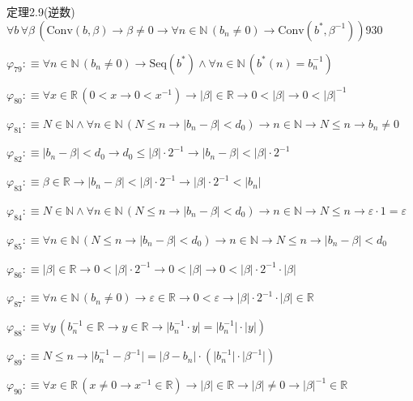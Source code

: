 \begin{fullproof}{定理2.9(逆数)}{$\forall b\,\forall \beta\,(\mathrm{Conv}(b,\beta) \to \beta \neq 0 \to \forall n \in \mathbb{N}\,(b_{n} \neq 0) \to \mathrm{Conv}(b^{\ast},\beta^{-1}))$}{930}
\begin{abbrevlist}
\item $\varphi_{79} :\equiv \forall n \in \mathbb{N}\,(b_{n} \neq 0) \to \mathrm{Seq}(b^{\ast}) \land \forall n \in \mathbb{N}\,(b^{\ast}(n) = b_{n}^{-1})$
\item $\varphi_{80} :\equiv \forall x \in \mathbb{R}\,(0 < x \to 0 < x^{-1}) \to \lvert \beta \rvert \in \mathbb{R} \to 0 < \lvert \beta \rvert \to 0 < \lvert \beta \rvert^{-1}$
\item $\varphi_{81} :\equiv N \in \mathbb{N} \land \forall n \in \mathbb{N}\,(N \leq n \to \lvert b_{n} - \beta \rvert < d_{0}) \to n \in \mathbb{N} \to N \leq n \to b_{n} \neq 0$
\item $\varphi_{82} :\equiv \lvert b_{n} - \beta \rvert < d_{0} \to d_{0} \leq \lvert \beta \rvert \cdot 2^{-1} \to \lvert b_{n} - \beta \rvert < \lvert \beta \rvert \cdot 2^{-1}$
\item $\varphi_{83} :\equiv \beta \in \mathbb{R} \to \lvert b_{n} - \beta \rvert < \lvert \beta \rvert \cdot 2^{-1} \to \lvert \beta \rvert \cdot 2^{-1} < \lvert b_{n} \rvert$
\item $\varphi_{84} :\equiv N \in \mathbb{N} \land \forall n \in \mathbb{N}\,(N \leq n \to \lvert b_{n} - \beta \rvert < d_{0}) \to n \in \mathbb{N} \to N \leq n \to \varepsilon \cdot 1 = \varepsilon$
\item $\varphi_{85} :\equiv \forall n \in \mathbb{N}\,(N \leq n \to \lvert b_{n} - \beta \rvert < d_{0}) \to n \in \mathbb{N} \to N \leq n \to \lvert b_{n} - \beta \rvert < d_{0}$
\item $\varphi_{86} :\equiv \lvert \beta \rvert \in \mathbb{R} \to 0 < \lvert \beta \rvert \cdot 2^{-1} \to 0 < \lvert \beta \rvert \to 0 < \lvert \beta \rvert \cdot 2^{-1} \cdot \lvert \beta \rvert$
\item $\varphi_{87} :\equiv \forall n \in \mathbb{N}\,(b_{n} \neq 0) \to \varepsilon \in \mathbb{R} \to 0 < \varepsilon \to \lvert \beta \rvert \cdot 2^{-1} \cdot \lvert \beta \rvert \in \mathbb{R}$
\item $\varphi_{88} :\equiv \forall y\,(b_{n}^{-1} \in \mathbb{R} \to y \in \mathbb{R} \to \lvert b_{n}^{-1} \cdot y \rvert = \lvert b_{n}^{-1} \rvert \cdot \lvert y \rvert)$
\item $\varphi_{89} :\equiv N \leq n \to \lvert b_{n}^{-1} - \beta^{-1} \rvert = \lvert \beta - b_{n} \rvert \cdot (\lvert b_{n}^{-1} \rvert \cdot \lvert \beta^{-1} \rvert)$
\item $\varphi_{90} :\equiv \forall x \in \mathbb{R}\,(x \neq 0 \to x^{-1} \in \mathbb{R}) \to \lvert \beta \rvert \in \mathbb{R} \to \lvert \beta \rvert \neq 0 \to \lvert \beta \rvert^{-1} \in \mathbb{R}$

\end{abbrevlist}
\end{fullproof}
